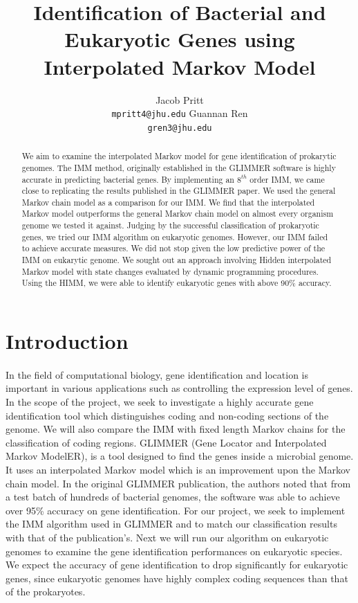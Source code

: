 \documentclass[11pt,letterpaper]{article}
\title{Identification of Bacterial and Eukaryotic Genes using Interpolated Markov Model}
\author{Jacob Pritt\\
  {\tt mpritt4@jhu.edu}
  \And
  Guannan Ren \\
  {\tt gren3@jhu.edu}}
\date{}
\begin{document}
\maketitle
\begin{abstract}
	We aim to examine the interpolated Markov model for gene identification of prokarytic genomes. The IMM method, originally established in the GLIMMER software is highly accurate in predicting bacterial genes. By implementing an $8^{th}$ order IMM, we came close to replicating the results published in the GLIMMER paper. We used the general Markov chain model as a comparison for our IMM. We find that the interpolated Markov model outperforms the general Markov chain model on almost every organism genome we tested it against. Judging by the successful classification of prokaryotic genes, we tried our IMM algorithm on eukaryotic genomes. However, our IMM failed to achieve accurate measures. We did not stop given the low predictive power of the IMM on eukarytic genome. We sought out an approach involving Hidden interpolated Markov model with state changes evaluated by dynamic programming procedures. Using the HIMM, we were able to identify eukaryotic genes with above 90\% accuracy.
\end{abstract}

\section{Introduction}
\paragraph{}
In the field of computational biology, gene identification and location is important in various applications such as controlling the expression level of genes. In the scope of the project, we seek to investigate a highly accurate gene identification tool which distinguishes coding and non-coding sections of the genome. We will also compare the IMM with fixed length Markov chains for the classification of coding regions. GLIMMER (Gene Locator and Interpolated Markov ModelER), is a tool designed to find the genes inside a microbial genome. It uses an interpolated Markov model which is an improvement upon the Markov chain model. In the original GLIMMER publication, the authors noted that from a test batch of hundreds of bacterial genomes, the software was able to achieve over 95\% accuracy on gene identification. For our project, we seek to implement the IMM algorithm used in GLIMMER and to match our classification results with that of the publication's. Next we will run our algorithm on eukaryotic genomes to examine the gene identification performances on eukaryotic species. We expect the accuracy of gene identification to drop significantly for eukaryotic genes, since eukaryotic genomes have highly complex coding sequences than that of the prokaryotes.
\end{document}
